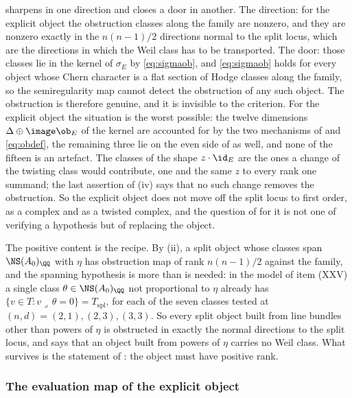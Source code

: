 \begin{remark}\label{rem:obstructionmeaning}
 sharpens  in one
direction and closes a door in another. The direction: for the explicit
object the obstruction classes along the family are nonzero, and they are
nonzero exactly in the $n(n-1)/2$ directions normal to the split locus,
which are the directions in which the Weil class has to be transported.
The door: those classes lie in the kernel of $\sigma_{E}$ by
\eqref{eq:sigmaob}, and \eqref{eq:sigmaob} holds for every object whose
Chern character is a flat section of Hodge classes along the family, so the
semiregularity map cannot detect the obstruction of any such object. The
obstruction is therefore genuine, and it is invisible to the criterion. For
the explicit object the situation is the worst possible: the twelve
dimensions $\Delta\oplus\image\ob_{E}$ of the kernel are accounted for by
the two mechanisms of  and \eqref{eq:obdef}, the
remaining three lie on the even side of  as well,
and none of the fifteen is an artefact. The classes of the shape
$z\cdot\id_{E}$ are the ones a change of the twisting class would
contribute, one and the same $z$ to every rank one summand; the last
assertion of (iv) says that no such change removes the obstruction. So the
explicit object does not move off the split locus to first order, as a
complex and as a twisted complex, and the question of  for
it is not one of verifying a hypothesis but of replacing the object.

The positive content is the recipe. By (ii), a split object whose classes
span $\NS(A_{0})_{\QQ}$ with $\eta$ has obstruction map of rank
$n(n-1)/2$ against the family, and the spanning hypothesis is more than is
needed: in the model of item (XXV) a single class $\theta\in\NS(A_{0})_{\QQ}$
not proportional to $\eta$ already has $\{v\in T:v\lrcorner\,\theta=0\}=
T_{\mathrm{spl}}$, for each of the seven classes tested at
$(n,d)=(2,1),(2,3),(3,3)$. So every split object built from line bundles
other than powers of $\eta$ is obstructed in exactly the normal directions
to the split locus, and  says that an object built
from powers of $\eta$ carries no Weil class. What survives is the statement
of : the object must have positive rank.
\end{remark}

\subsubsection*{The evaluation map of the explicit object}

